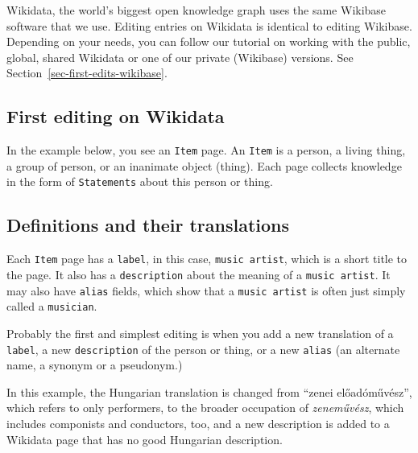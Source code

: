 \documentclass[
  letterpaper,
  DIV=11,
  numbers=noendperiod]{scrreprt}
\begin{document}
\begin{tcolorbox}[enhanced jigsaw, opacityback=0, bottomrule=.15mm, rightrule=.15mm, toptitle=1mm, breakable, colbacktitle=quarto-callout-tip-color!10!white, colback=white, title=\textcolor{quarto-callout-tip-color}{\faLightbulb}\hspace{0.5em}{Tip}, leftrule=.75mm, toprule=.15mm, left=2mm, arc=.35mm, colframe=quarto-callout-tip-color-frame, coltitle=black, titlerule=0mm, bottomtitle=1mm, opacitybacktitle=0.6]

Wikidata, the world's biggest open knowledge graph uses the same
Wikibase software that we use. Editing entries on Wikidata is identical
to editing Wikibase. Depending on your needs, you can follow our
tutorial on working with the public, global, shared Wikidata or one of
our private (Wikibase) versions. See
Section~\ref{sec-first-edits-wikibase}.

\end{tcolorbox}

\subsection{First editing on Wikidata}\label{sec-first-edits-wikidata}

In the example below, you see an \texttt{Item} page. An \texttt{Item} is
a person, a living thing, a group of person, or an inanimate object
(thing). Each page collects knowledge in the form of \texttt{Statements}
about this person or thing.

\subsection{Definitions and their
translations}\label{definitions-and-their-translations}

Each \texttt{Item} page has a \texttt{label}, in this case,
\texttt{music\ artist}, which is a short title to the page. It also has
a \texttt{description} about the meaning of a \texttt{music\ artist}. It
may also have \texttt{alias} fields, which show that a
\texttt{music\ artist} is often just simply called a \texttt{musician}.

Probably the first and simplest editing is when you add a new
translation of a \texttt{label}, a new \texttt{description} of the
person or thing, or a new \texttt{alias} (an alternate name, a synonym
or a pseudonym.)

In this example, the Hungarian translation is changed from ``zenei
előadóművész'', which refers to only performers, to the broader
occupation of \emph{zeneművész}, which includes componists and
conductors, too, and a new description is added to a Wikidata page that
has no good Hungarian description.
\end{document}
